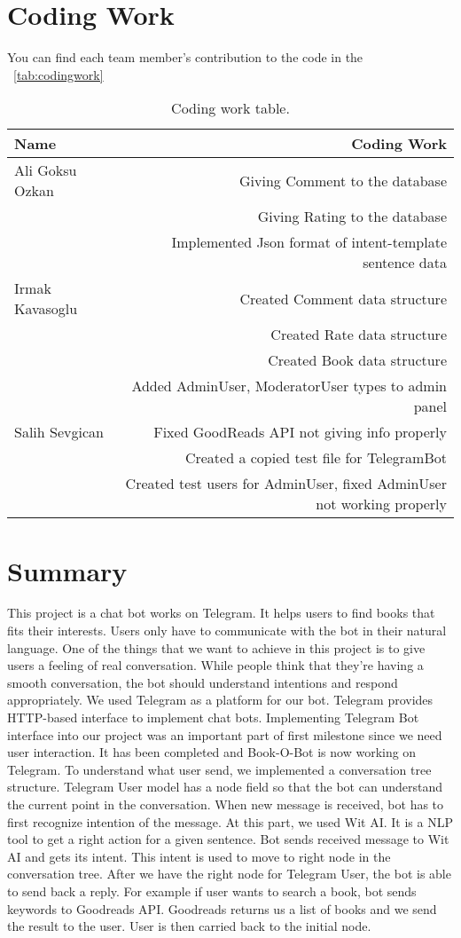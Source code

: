\documentclass[a4paper]{article}
\begin{document}
\section{Coding Work}
You can find each team member's contribution to the code in the ~\autoref{tab:codingwork}

\begin{table}[!hb]
\centering
\begin{tabular}{l|r}
Name & Coding Work \\\hline
Ali Goksu Ozkan & Giving Comment to the database \\
& Giving Rating to the database \\
& Implemented Json format of intent-template sentence data \\\hline
Irmak Kavasoglu & Created Comment data structure \\
& Created Rate data structure \\
& Created Book data structure \\
& Added AdminUser, ModeratorUser types to admin panel \\\hline
Salih Sevgican & Fixed GoodReads API not giving info properly \\
& Created a copied test file for TelegramBot \\
& Created test users for AdminUser, fixed AdminUser not working properly
\end{tabular}
\caption{\label{tab:codingwork}Coding work table.}
\end{table}

\section{Summary}
This project is a chat bot works on Telegram. It helps users to find books that fits their interests.
Users only have to communicate with the bot in their natural language. One of the things that we
want to achieve in this project is to give users a feeling of real conversation. While people think
that they’re having a smooth conversation, the bot should understand intentions and respond
appropriately.
We used Telegram as a platform for our bot. Telegram provides HTTP-based interface to
implement chat bots. Implementing Telegram Bot interface into our project was an important
part of first milestone since we need user interaction. It has been completed and Book-O-Bot is
now working on Telegram.
To understand what user send, we implemented a conversation tree structure. Telegram User
model has a node field so that the bot can understand the current point in the conversation. When
new message is received, bot has to first recognize intention of the message. At this part, we used
Wit AI. It is a NLP tool to get a right action for a given sentence. Bot sends received message to
Wit AI and gets its intent. This intent is used to move to right node in the conversation tree.
After we have the right node for Telegram User, the bot is able to send back a reply. For
example if user wants to search a book, bot sends keywords to Goodreads API.
Goodreads returns us a list of books and we send the result to the user. User is then carried
back to the initial node.
\end{document}
